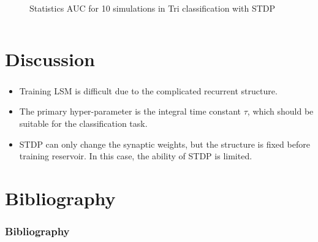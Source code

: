 \documentclass[10pt,aspectratio=43,mathserif, notes]{beamer}
\begin{document}
\begin{frame}
\begin{columns}
\begin{column}{0.5\textwidth}
\begin{figure}[h]
            \caption{Statistics AUC for 10 simulations in Tri classification with STDP}
            \label{ST_Task}
            \end{figure}
            \end{column}
            \end{columns}
		\end{frame}
%

\section[Discussion]{Discussion}
		\begin{frame}
		  \frametitle{\textbf{\secname}}
		    \begin{itemize}
                \item Training LSM is difficult due to the complicated recurrent structure.
                \item The primary hyper-parameter is the integral time constant $\tau$, which should be suitable for the classification task.
                \item STDP can only change the synaptic weights, but the structure is fixed before training reservoir. In this case, the ability of STDP is limited.
            \end{itemize}
		    \end{frame}

\small\section*{Bibliography}
\begin{frame}[allowframebreaks]\frametitle{\secname}
\frametitle{Bibliography}


\end{frame}
\end{document}
